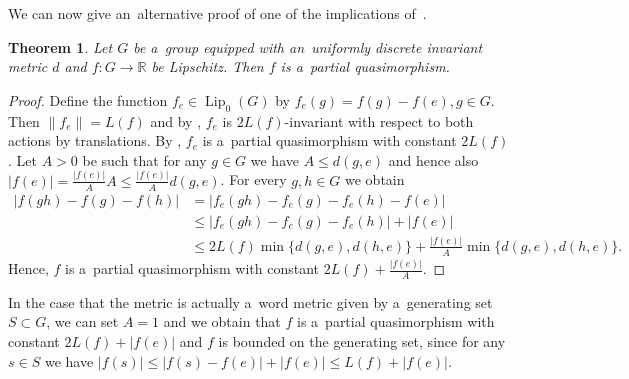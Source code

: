 \documentclass[11pt,a4paper]{amsart}
\newtheorem{theorem}{Theorem}[section]
\theoremstyle{definition}
\newcommand{\R}{\mathbb{R}}
\newcommand{\abs}[1]{\left| #1 \right|}
\newcommand{\norm}[1]{\left\| #1 \right\|}
\newcommand{\Lipz}{\operatorname{Lip}_0}
\begin{document}
	We can now give an~alternative proof of one of the implications of~\cite[Theorem~1.1]{Kedra}.
	\begin{theorem}
		Let $G$ be a~group equipped with an~uniformly discrete invariant metric $d$ and $f: G \to \R$ be Lipschitz. Then $f$ is a~partial quasimorphism.
	\end{theorem}
	\begin{proof}
		Define the function $f_e \in \Lipz(G)$ by $f_e(g) = f(g) - f(e), g \in G$. Then $\norm{f_e} = L(f)$ and by , $f_e$ is $2L(f)$-invariant with respect to both actions by translations. By , $f_e$ is a~partial quasimorphism with constant $2L(f)$. Let $A > 0$ be such that for any $g \in G$ we have $A \leq d(g, e)$ and hence also $\abs{f(e)} = \frac{\abs{f(e)}}{A}A \leq \frac{\abs{f(e)}}{A}d(g,e)$. For every $g, h \in G$ we obtain
		\begin{align*}
			\abs{f(gh) - f(g) - f(h)}
			&= \abs{f_e(gh) - f_e(g) - f_e(h) - f(e)}\\
			&\leq \abs{f_e(gh) - f_e(g) - f_e(h)} + \abs{f(e)}\\
			&\leq 2L(f) \min\{d(g, e), d(h, e)\} + \frac{\abs{f(e)}}{A} \min\{d(g, e), d(h, e)\}.
		\end{align*}
		Hence, $f$ is a~partial quasimorphism with constant $2L(f) + \frac{\abs{f(e)}}{A}$.
	\end{proof}
	
	In the case that the metric is actually a~word metric given by a~generating set $S \subset G$, we can set $A = 1$ and we obtain that $f$ is a~partial quasimorphism with constant $2L(f) + \abs{f(e)}$ and $f$ is bounded on the generating set, since for any $s \in S$ we have $\abs{f(s)} \leq \abs{f(s) - f(e)} + \abs{f(e)} \leq L(f) + \abs{f(e)}$.
	
	
	
	
	
	
	
	
\end{document}

